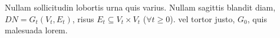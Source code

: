 \documentclass[a0paper,portrait]{baposter}
\begin{document}
\begin{poster}
{Nullam sollicitudin lobortis urna quis varius. Nullam sagittis blandit diam, $DN = G_t(V_t,E_t)$, risus $E_t \subseteq V_t \times V_t$ ($\forall t \geq 0$). vel tortor justo, $G_0$, quis malesuada lorem.


}















\end{poster}
\end{document}
